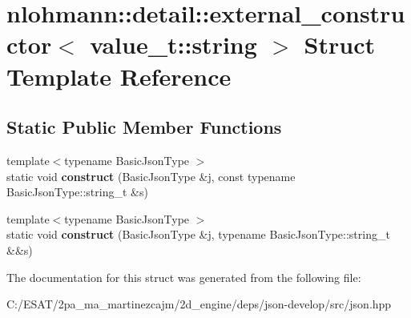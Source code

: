 \hypertarget{structnlohmann_1_1detail_1_1external__constructor_3_01value__t_1_1string_01_4}{}\section{nlohmann\+:\+:detail\+:\+:external\+\_\+constructor$<$ value\+\_\+t\+:\+:string $>$ Struct Template Reference}
\label{structnlohmann_1_1detail_1_1external__constructor_3_01value__t_1_1string_01_4}
\subsection*{Static Public Member Functions}
\begin{DoxyCompactItemize}
\item 
\mbox{\label{structnlohmann_1_1detail_1_1external__constructor_3_01value__t_1_1string_01_4_ad88d0b4b7ea01ea20e12cc1b82fe0d92}} 
{\footnotesize template$<$typename Basic\+Json\+Type $>$ }\\static void {\bfseries construct} (Basic\+Json\+Type \&j, const typename Basic\+Json\+Type\+::string\+\_\+t \&s)
\item 
\mbox{\label{structnlohmann_1_1detail_1_1external__constructor_3_01value__t_1_1string_01_4_a74f56b9ca1d4e8db9751353d76668322}} 
{\footnotesize template$<$typename Basic\+Json\+Type $>$ }\\static void {\bfseries construct} (Basic\+Json\+Type \&j, typename Basic\+Json\+Type\+::string\+\_\+t \&\&s)
\end{DoxyCompactItemize}


The documentation for this struct was generated from the following file\+:\begin{DoxyCompactItemize}
\item 
C\+:/\+E\+S\+A\+T/2pa\+\_\+ma\+\_\+martinezcajm/2d\+\_\+engine/deps/json-\/develop/src/json.\+hpp\end{DoxyCompactItemize}
